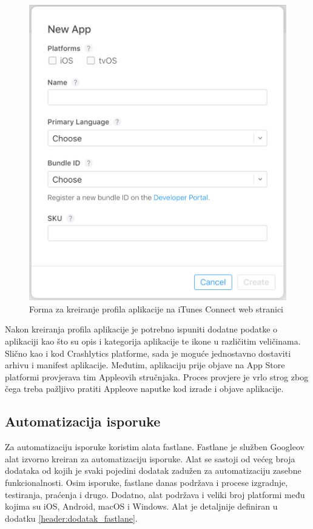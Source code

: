 \documentclass[times, utf8, diplomski, numeric]{fer}
\begin{document}
\begin{appendices}
\begin{figure}
\centering
\includegraphics[scale=0.4]{iTunesConnectAppCreation}
\caption{Forma za kreiranje profila aplikacije na iTunes Connect web stranici}
\label{fig:iTunesConnectAppCreation}
\end{figure}

Nakon kreiranja profila aplikacije je potrebno ispuniti dodatne podatke o aplikaciji kao što su opis i kategorija aplikacije te ikone u različitim veličinama. Slično kao i kod Crashlytics platforme, sada je moguće jednostavno dostaviti arhivu i manifest aplikacije. Međutim, aplikaciju prije objave na App Store platformi provjerava tim Appleovih stručnjaka. Proces provjere je vrlo strog zbog čega treba pažljivo pratiti Appleove naputke kod izrade i objave aplikacije.

\subsection{Automatizacija isporuke}

Za automatizaciju isporuke koristim alata fastlane. Fastlane je služben Googleov alat izvorno kreiran za automatizaciju isporuke. Alat se sastoji od većeg broja dodataka od kojih je svaki pojedini dodatak zadužen za automatizaciju zasebne funkcionalnosti. Osim isporuke, fastlane danas podržava i procese izgradnje, testiranja, praćenja i drugo. Dodatno, alat podržava i veliki broj platformi među kojima su iOS, Android, macOS i Windows. Alat je detaljnije definiran u dodatku \ref{header:dodatak_fastlane}.


\end{appendices}
\end{document}
